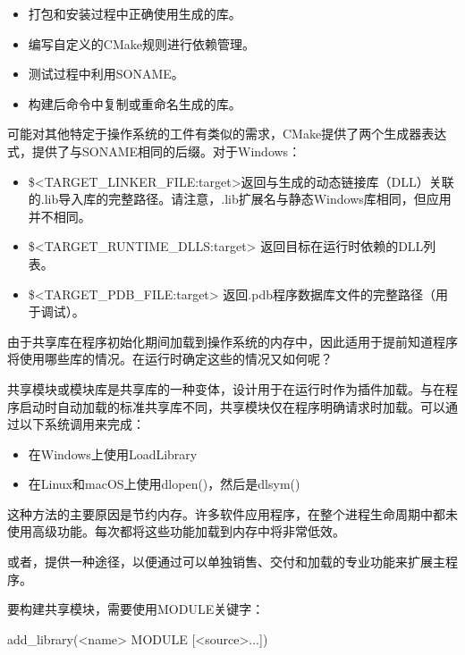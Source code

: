 \begin{itemize}
\item
打包和安装过程中正确使用生成的库。

\item
编写自定义的CMake规则进行依赖管理。

\item
测试过程中利用SONAME。

\item
构建后命令中复制或重命名生成的库。
\end{itemize}

可能对其他特定于操作系统的工件有类似的需求，CMake提供了两个生成器表达式，提供了与SONAME相同的后缀。对于Windows：

\begin{itemize}
\item
\$<TARGET\_LINKER\_FILE:target>返回与生成的动态链接库（DLL）关联的.lib导入库的完整路径。请注意，.lib扩展名与静态Windows库相同，但应用并不相同。

\item
\$<TARGET\_RUNTIME\_DLLS:target> 返回目标在运行时依赖的DLL列表。

\item
\$<TARGET\_PDB\_FILE:target> 返回.pdb程序数据库文件的完整路径（用于调试）。
\end{itemize}

由于共享库在程序初始化期间加载到操作系统的内存中，因此适用于提前知道程序将使用哪些库的情况。在运行时确定这些的情况又如何呢？


共享模块或模块库是共享库的一种变体，设计用于在运行时作为插件加载。与在程序启动时自动加载的标准共享库不同，共享模块仅在程序明确请求时加载。可以通过以下系统调用来完成：

\begin{itemize}
\item
在Windows上使用LoadLibrary

\item
在Linux和macOS上使用dlopen()，然后是dlsym()
\end{itemize}

这种方法的主要原因是节约内存。许多软件应用程序，在整个进程生命周期中都未使用高级功能。每次都将这些功能加载到内存中将非常低效。

或者，提供一种途径，以便通过可以单独销售、交付和加载的专业功能来扩展主程序。

要构建共享模块，需要使用MODULE关键字：

\begin{shell}
add_library(<name> MODULE [<source>...])
\end{shell}


